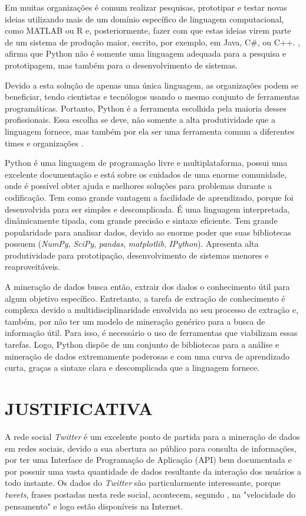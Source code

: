 Em muitas organizações é comum realizar pesquisas, prototipar e testar novas ideias utilizando mais de um domínio específico de linguagem computacional, como MATLAB ou R e, posteriormente, fazer com que estas ideias virem parte de um sistema de produção maior, escrito, por exemplo, em Java, C\#, ou C++. , afirma que Python não é somente uma linguagem adequada para a pesquisa e prototipagem, mas também para o desenvolvimento de sistemas.

Devido a esta solução de apenas uma única linguagem, as organizações podem se beneficiar, tendo cientistas e tecnólogos usando o mesmo conjunto de ferramentas programáticas. Portanto, Python é a ferramenta escolhida pela maioria desses profissionais. Essa escolha se deve, não somente a alta produtividade que a linguagem fornece, mas também por ela ser uma ferramenta comum a diferentes times e organizações \cite{kaldero}. 

Python é uma linguagem de programação livre e multiplataforma, possui uma excelente documentação e está sobre os cuidados de uma enorme comunidade, onde é possível obter ajuda e melhores soluções para problemas durante a codificação. Tem como grande vantagem a facilidade de aprendizado, porque foi desenvolvida para ser simples e descomplicada. É uma linguagem interpretada, dinâmicamente tipada, com grande precisão e sintaxe eficiente. Tem grande popularidade para analisar dados, devido ao enorme poder que suas bibliotecas possuem (\textit{NumPy}, \textit{SciPy}, \textit{pandas}, \textit{matplotlib}, \textit{IPython}). Apresenta alta produtividade para prototipação, desenvolvimento de sistemas menores e reaproveitáveis.

A mineração de dados busca então, extrair dos dados o conhecimento útil para algum objetivo específico. Entretanto, a tarefa de extração de conhecimento é complexa devido a multidisciplinaridade envolvida no seu processo de extração e, também, por não ter um modelo de mineração genérico para a busca de informação útil. Para isso, é necessário o uso de ferramentas que viabilizam essas tarefas. Logo, Python dispõe de um conjunto de bibliotecas para a análise e mineração de dados extremamente poderosas e com uma curva de aprendizado curta, graças a sintaxe clara e descomplicada que a linguagem fornece.


\section{JUSTIFICATIVA}\label{sec:justificativa}
A rede social \textit{Twitter} é um excelente ponto de partida para a mineração de dados em redes sociais, devido a sua abertura ao público para consulta de informações, por ter uma Interface de Programação de Aplicação (API) bem documentada e por possuir uma vasta quantidade de dados resultante da interação dos usuários a todo instante. Os dados do \textit{Twitter} são particularmente interessante, porque \textit{tweets}, frases postadas nesta rede social, acontecem, segundo , na "velocidade do pensamento" \space e logo estão disponíveis na Internet.

